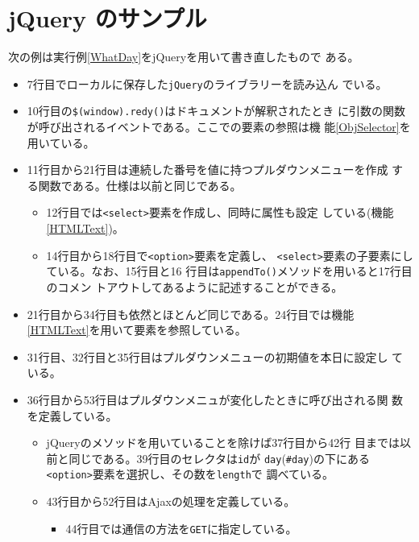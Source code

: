 \section{jQuery のサンプル}
 \begin{Exec}\upshape\label{ExjQuery}
  次の例は実行例\ref{WhatDay}をjQueryを用いて書き直したもので
 ある。
 \begin{itemize}
  \item 7行目でローカルに保存した\texttt{jQuery}のライブラリーを読み込ん
        でいる。
  \item 10行目の\texttt{\$(window).redy()}はドキュメントが解釈されたとき
	に引数の関数が呼び出されるイベントである。ここでの要素の参照は機
	能\ref{ObjSelector}を用いている。
  \item 11行目から21行目は連続した番号を値に持つプルダウンメニューを作成
	する関数である。仕様は以前と同じである。
	\begin{itemize}
	 \item 12行目では\texttt{<select>}要素を作成し、同時に属性も設定
	       している(機能\ref{HTMLText})。
	 \item 14行目から18行目で\texttt{<option>}要素を定義し、
	       \texttt{<select>}要素の子要素にしている。なお、15行目と16
	       行目は\texttt{appendTo()}メソッドを用いると17行目のコメン
	       トアウトしてあるように記述することができる。
	\end{itemize}
  \item 21行目から34行目も依然とほとんど同じである。24行目では機能
	\ref{HTMLText}を用いて要素を参照している。
  \item 31行目、32行目と35行目はプルダウンメニューの初期値を本日に設定し
	ている。
  \item 36行目から53行目はプルダウンメニュが変化したときに呼び出される関
	数を定義している。
	\begin{itemize}
	 \item jQueryのメソッドを用いていることを除けば37行目から42行
	       目までは以前と同じである。39行目のセレクタは\texttt{id}が
	       \texttt{day}(\texttt{\#day})の下にある
	       \texttt{<option>}要素を選択し、その数を\texttt{length}で
	       調べている。
	 \item 43行目から52行目はAjaxの処理を定義している。
\begin{itemize}
 \item 44行目では通信の方法を\texttt{GET}に指定している。

\end{itemize}
\end{itemize}
\end{itemize}
\end{Exec}
